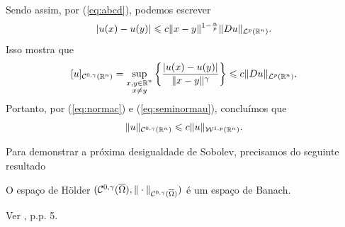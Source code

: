 \begin{prf}
    Sendo assim, por (\ref{eq:abcd}), podemos escrever
    \[
        |u(x) - u(y)| \leqslant c \Vert x - y \Vert^{1 - \frac{n}{p}} \Vert Du \Vert_{\mathcal{L}^p(\mathbb{R}^n)}.
    \]
    Isso mostra que
    \begin{equation} \label{eq:seminormau}
        [u]_{\mathcal{C}^{0,\gamma}(\mathbb{R}^n)} = \sup_{\substack{x,y \in \mathbb{R}^n\\x \neq y}} \left\{ \frac{|u(x) - u(y)|}{\Vert x - y \Vert^{\gamma}} \right\} \leqslant c \Vert Du \Vert_{\mathcal{L}^p(\mathbb{R}^n)}.
    \end{equation}
    Portanto, por (\ref{eq:normac}) e (\ref{eq:seminormau}), concluímos que
    \[
        \Vert u \Vert_{\mathcal{C}^{0,\gamma}(\mathbb{R}^n)} \leqslant c \Vert u \Vert_{\mathcal{W}^{1,p}(\mathbb{R}^n)}.
    \]
\end{prf}

Para demonstrar a próxima desigualdade de Sobolev, precisamos do seguinte resultado

\begin{tbox} \label{thm:holder-completo}
    O espaço de Hölder $(\mathcal{C}^{0,\gamma}(\overline\Omega), \Vert \cdot \Vert_{\mathcal{C}^{0,\gamma}(\overline\Omega)})$ é um espaço de Banach.
\end{tbox}
\begin{prf}
    Ver \cite{irina-holder.spaces}, p.p. 5.
\end{prf}

